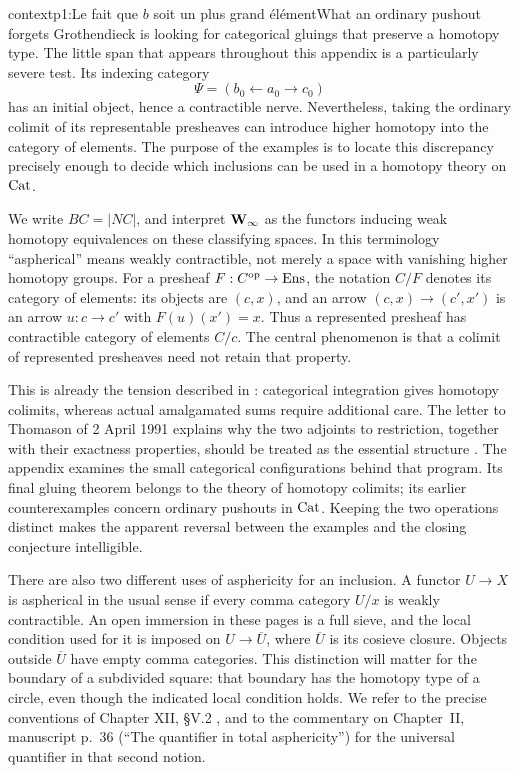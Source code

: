 \begin{dcomment}{context}{p1:Le fait que $b$ soit un plus grand élément}{What an ordinary pushout forgets}
Grothendieck is looking for categorical gluings that preserve a homotopy type. The little span that appears throughout this appendix is a particularly severe test. Its indexing category
\[
  \Psi=(b_0\longleftarrow a_0\longrightarrow c_0)
\]
has an initial object, hence a contractible nerve. Nevertheless, taking the ordinary colimit of its representable presheaves can introduce higher homotopy into the category of elements. The purpose of the examples is to locate this discrepancy precisely enough to decide which inclusions can be used in a homotopy theory on \(\mathrm{Cat}\).

We write \(BC=|NC|\), and interpret \(\mathbf{W}_{\infty}\) as the functors inducing weak homotopy equivalences on these classifying spaces. In this terminology ``aspherical'' means weakly contractible, not merely a space with vanishing higher homotopy groups. For a presheaf \(F:C^{\mathrm{op}}\to\mathrm{Ens}\), the notation \(C/F\) denotes its category of elements: its objects are \((c,x)\), and an arrow \((c,x)\to(c',x')\) is an arrow \(u:c\to c'\) with \(F(u)(x')=x\). Thus a represented presheaf has contractible category of elements \(C/c\). The central phenomenon is that a colimit of represented presheaves need not retain that property.

This is already the tension described in \citet[\S69]{Grothendieck1983}: categorical integration gives homotopy colimits, whereas actual amalgamated sums require additional care. The letter to Thomason of 2 April 1991 explains why the two adjoints to restriction, together with their exactness properties, should be treated as the essential structure \citep[pp.~8--9]{Grothendieck1991Letter}. The appendix examines the small categorical configurations behind that program. Its final gluing theorem belongs to the theory of homotopy colimits; its earlier counterexamples concern ordinary pushouts in \(\mathrm{Cat}\). Keeping the two operations distinct makes the apparent reversal between the examples and the closing conjecture intelligible.

There are also two different uses of asphericity for an inclusion. A functor \(U\to X\) is aspherical in the usual sense if every comma category \(U/x\) is weakly contractible. An open immersion in these pages is a full sieve, and the local condition used for it is imposed on \(U\to\overline U\), where \(\overline U\) is its cosieve closure. Objects outside \(\overline U\) have empty comma categories. This distinction will matter for the boundary of a subdivided square: that boundary has the homotopy type of a circle, even though the indicated local condition holds. We refer to the precise conventions of Chapter XII, \S V.2 \citep{Grothendieck1990XII}, and to the commentary on Chapter~II, manuscript p.~36 (``The quantifier in total asphericity'') for the universal quantifier in that second notion.
\end{dcomment}


